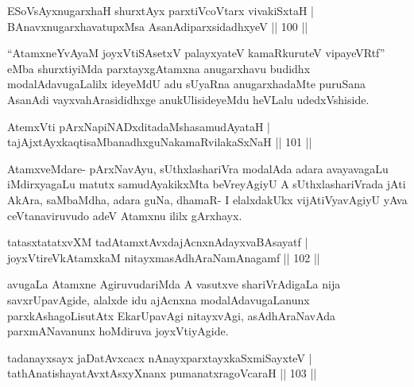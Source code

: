 \begin{shl}
ESoV\s sAyxnugarxhaH shurxtAyx parxtiVcoV\s tarx vivakiSxtaH | \\
BAnavxnugarxhavatupxMsa AsanAdiparxsidadhxyeV \hfill||  100 ||  
\end{shl}

\begin{artha}
``AtamxneYvAyaM joyxVtiSA\s \s setxV palayxyateV kamaRkuruteV vipayeVRtf'' eMba shurxtiyiMda parxtayxgAtamxna anugarxhavu budidhx modalAdavugaLalilx ideyeMdU adu sUyaRna anugarxhadaMte puruSana AsanAdi vayxvahArasididhxge anukUlisideyeMdu heVLalu udedxVshiside.
\end{artha}


\begin{shl}
AtemxVti pArxNapiNADxditadaMshasamudAyataH | \\
tajAjxtAyxkaqtisaMbanadhxguNakamaRvilakaSxNaH \hfill ||  101 ||  
\end{shl}

\begin{artha}
AtamxveMdare- pArxNavAyu, sUthxlashariVra modalAda adara avayavagaLu iMdirxyagaLu matutx samudAyakikxMta beVreyAgiyU A sUthxlashariVrada jAti AkAra, saMbaMdha, adara guNa, dhamaR- I elalxdakUkx vijAtiVyavAgiyU yAva ceVtanaviruvudo adeV Atamxnu ililx gArxhayx.
\end{artha}


\begin{shl}
tatasxtatatxvXM tadAtamxtAvxdajAcnxnAdayxvaBAsayatf | \\
joyxVtireVkAtamxkaM nitayxmasAdhAraNamAnagamf \hfill||  102 ||  
\end{shl}

\begin{artha}
avugaLa Atamxne AgiruvudariMda A vasutxve shariVrAdigaLa nija savxrUpavAgide, alalxde idu ajAcnxna modalAdavugaLanunx parxkAshagoLisutAtx EkarUpavAgi nitayxvAgi, asAdhAraNavAda parxmANavanunx hoMdiruva joyxVtiyAgide.
\end{artha}


\begin{shl}
tadanayxsayx jaDatAvxcacx nAnayxparxtayxkaSxmiSayxteV |  \\
tathA\s natishayatAvxtAsxyXnanx pumanatxragoVcaraH \hfill||  103 ||  
\end{shl}

